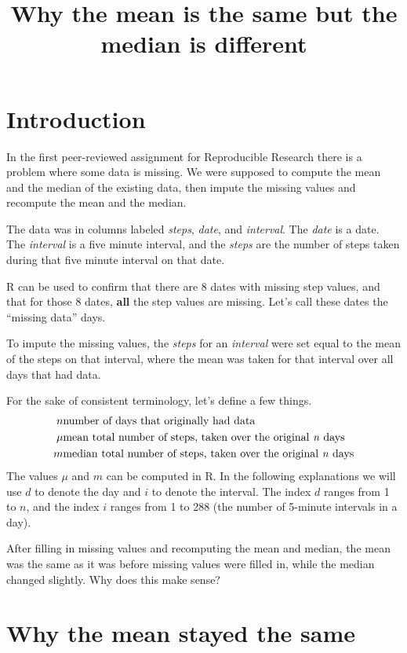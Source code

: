 \documentclass{article}
\title{Why the mean is the same but the median is different}
\begin{document}
\maketitle

\section{Introduction}

In the first peer-reviewed assignment for Reproducible Research there is a problem where some data is missing. We were supposed to compute the mean and the median of the existing data, then impute the missing values and recompute the mean and the median. 

The data was in columns labeled \textit{steps}, \textit{date}, and \textit{interval}. The \textit{date} is a date. The \textit{interval} is a five minute interval, and the \textit{steps} are the number of steps taken during that five minute interval on that date.

R can be used to confirm that there are 8 dates with missing step values, and that for those 8 dates, \textbf{all} the step values are missing. Let's call these dates the ``missing data'' days.

To impute the missing values, the \textit{steps} for an \textit{interval} were set equal to the mean of the steps on that interval, where the mean was taken for that interval over all days that had data. 

For the sake of consistent terminology, let's define a few things.
\begin{eqnarray*}
 n & \text{number of days that originally had data}\\
 \mu & \text{mean total number of steps, taken over the original  \textit{n} days}\\
 m & \text{median total number of steps, taken over the original \textit{n} days}
 \end{eqnarray*}
The values $\mu$ and $m$ can be computed in R.
In the following explanations we will use $d$ to denote the day and $i$ to denote the interval. The index $d$ ranges from 1 to $n$, and the index $i$ ranges from 1 to 288 (the number of 5-minute intervals in a day).

After filling in missing values and recomputing the mean and median, the mean was the same as it was before missing values were filled in, while the median changed slightly.  Why does this make sense?

\section{Why the mean stayed the same}
\end{document}
